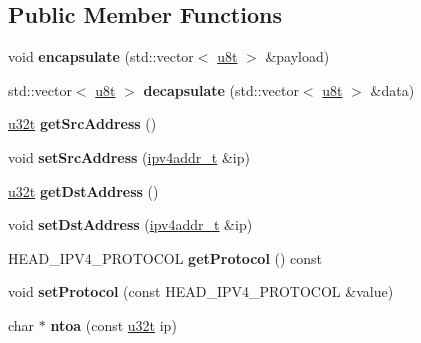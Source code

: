 \subsection*{Public Member Functions}
\begin{DoxyCompactItemize}
\item 
\mbox{\label{classIPv4_a1a9cf95c0b539638ccf87ec9540d1f5f}} 
void {\bfseries encapsulate} (std\+::vector$<$ \hyperlink{macros_8h_a176a4ab0531a048e0693a4520c550193}{u8t} $>$ \&payload)
\item 
\mbox{\label{classIPv4_ac755be8eb652472e2976200f4c7112da}} 
std\+::vector$<$ \hyperlink{macros_8h_a176a4ab0531a048e0693a4520c550193}{u8t} $>$ {\bfseries decapsulate} (std\+::vector$<$ \hyperlink{macros_8h_a176a4ab0531a048e0693a4520c550193}{u8t} $>$ \&data)
\item 
\mbox{\label{classIPv4_aee57f9b38cf587fd7580324b4e0cf363}} 
\hyperlink{macros_8h_a464a07ed2c6d005d677113cc44750a64}{u32t} {\bfseries get\+Src\+Address} ()
\item 
\mbox{\label{classIPv4_a4b2067f9ec3bc10827b005a41ab8629c}} 
void {\bfseries set\+Src\+Address} (\hyperlink{unionipv4addr__t}{ipv4addr\+\_\+t} \&ip)
\item 
\mbox{\label{classIPv4_a3d00ed1f1cbee5b83110c896b785cf2a}} 
\hyperlink{macros_8h_a464a07ed2c6d005d677113cc44750a64}{u32t} {\bfseries get\+Dst\+Address} ()
\item 
\mbox{\label{classIPv4_afdf051ffbaafe88e789a222f39a75226}} 
void {\bfseries set\+Dst\+Address} (\hyperlink{unionipv4addr__t}{ipv4addr\+\_\+t} \&ip)
\item 
\mbox{\label{classIPv4_abd91126dd9d1f07b31e42b7df0d5f210}} 
H\+E\+A\+D\+\_\+\+I\+P\+V4\+\_\+\+P\+R\+O\+T\+O\+C\+OL {\bfseries get\+Protocol} () const
\item 
\mbox{\label{classIPv4_ac157b4db97d939fbe2c3f3ae0ed1425a}} 
void {\bfseries set\+Protocol} (const H\+E\+A\+D\+\_\+\+I\+P\+V4\+\_\+\+P\+R\+O\+T\+O\+C\+OL \&value)
\item 
\mbox{\label{classIPv4_a46bc1d4063db256e32195873bc52ba6a}} 
char $\ast$ {\bfseries ntoa} (const \hyperlink{macros_8h_a464a07ed2c6d005d677113cc44750a64}{u32t} ip)
\end{DoxyCompactItemize}
